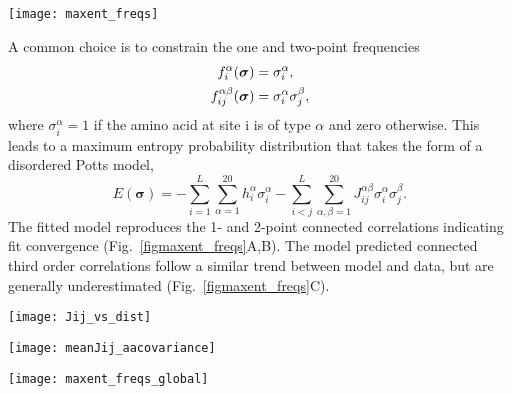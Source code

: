 \begin{figure*}
    \texttt{[image: maxent\_freqs]}
    \caption{Connected correlation functions of a maximum entropy model based on 1 and 2-point frequencies ressemble those of the training test set (upper row) within the training and test set error (lower row). Color indicates local density in regions with overplotting.
    \label{figmaxent_freqs}
    }
\end{figure*}

A common choice is to constrain the one and two-point frequencies
\begin{align}
    f_i^\alpha(\boldsymbol \sigma) &= \sigma_i^\alpha, \\
    f_{ij}^{\alpha\beta}(\boldsymbol \sigma) &= \sigma_i^\alpha \sigma_j^\beta,
\end{align}
where $\sigma_i^\alpha = 1$ if the amino acid at site i is of type $\alpha$ and zero otherwise.
This leads to a maximum entropy probability distribution that takes the form of a disordered Potts model,
\begin{equation}
    E(\boldsymbol \sigma) = - \sum_{i=1}^L \sum_{\alpha = 1}^{20} h_i^\alpha \sigma_i^\alpha - \sum_{i<j}^L \sum_{\alpha,\beta = 1}^{20} J_{ij}^{\alpha \beta}  \sigma_i^\alpha \sigma_j^\beta.
\end{equation}
The fitted model reproduces the 1- and 2-point connected correlations indicating fit convergence (Fig.~\ref{figmaxent_freqs}A,B). The model predicted connected third order correlations follow a similar trend between model and data, but are generally underestimated (Fig.~\ref{figmaxent_freqs}C).


\begin{figure*}
    \texttt{[image: Jij\_vs\_dist]}
    \caption{Mean coupling and deviations from mean coupling at a given distance. 
    \label{figJij_vs_dist}
    }
\end{figure*}


\begin{figure*}
    \texttt{[image: meanJij\_aacovariance]}
    \caption{Mean coupling matrix and covariance matrix between amino acid composition at protein level.
    \label{figJij_aacovariance}
    }
\end{figure*}


\begin{figure*}
    \texttt{[image: maxent\_freqs\_global]}
    \caption{Correlation between compositional Maxent model and test set (upper row) and training and test set (lower row) for the first three connected correlation functions.
    \label{figmaxent_freqs_global}
    }
\end{figure*}

